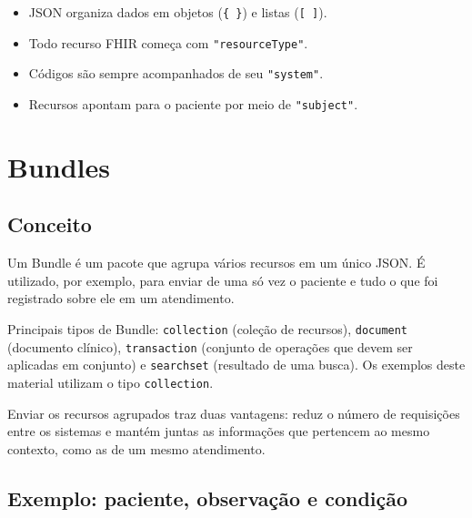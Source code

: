 \documentclass[11pt,a4paper]{article}
\newcommand{\codigo}[1]{\texttt{#1}}
\begin{document}
\begin{itemize}
  \item JSON organiza dados em objetos (\codigo{\{ \}}) e listas
    (\codigo{[ ]}).
  \item Todo recurso FHIR começa com \codigo{"resourceType"}.
  \item Códigos são sempre acompanhados de seu \codigo{"system"}.
  \item Recursos apontam para o paciente por meio de
    \codigo{"subject"}.
\end{itemize}

\section{Bundles}

\subsection{Conceito}

Um Bundle é um pacote que agrupa vários recursos em um único JSON. É
utilizado, por exemplo, para enviar de uma só vez o paciente e tudo o que
foi registrado sobre ele em um atendimento.

Principais tipos de Bundle: \codigo{collection} (coleção de recursos),
\codigo{document} (documento clínico), \codigo{transaction} (conjunto de
operações que devem ser aplicadas em conjunto) e \codigo{searchset}
(resultado de uma busca). Os exemplos deste material utilizam o tipo
\codigo{collection}.

Enviar os recursos agrupados traz duas vantagens: reduz o número de
requisições entre os sistemas e mantém juntas as informações que pertencem
ao mesmo contexto, como as de um mesmo atendimento.

\subsection{Exemplo: paciente, observação e condição}
\end{document}
